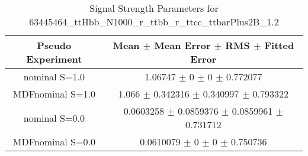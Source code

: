 \begin{table}
\centering
\caption{Signal Strength Parameters for 63445464\_ttHbb\_N1000\_r\_ttbb\_r\_ttcc\_ttbarPlus2B\_1.2}
\begin{tabular}{cc}
\toprule
Pseudo Experiment & Mean $\pm$ Mean Error $\pm$ RMS $\pm$ Fitted Error\\
\midrule
nominal S=1.0 & \num{1.06747} $\pm$ \num{0} $\pm$ \num{0} $\pm$ \num{0.772077}\\
MDFnominal S=1.0 & \num{1.066} $\pm$ \num{0.342316} $\pm$ \num{0.340997} $\pm$ \num{0.793322}\\
nominal S=0.0 & \num{0.0603258} $\pm$ \num{0.0859376} $\pm$ \num{0.0859961} $\pm$ \num{0.731712}\\
MDFnominal S=0.0 & \num{0.0610079} $\pm$ \num{0} $\pm$ \num{0} $\pm$ \num{0.750736}\\
\bottomrule
\end{tabular}
\end{table}